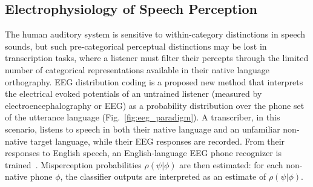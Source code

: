 \subsection{Electrophysiology of Speech Perception}

The human auditory system is sensitive to within-category distinctions
in speech sounds, but such pre-categorical perceptual distinctions may
be lost in transcription tasks, where a listener must filter their
percepts through the limited number of categorical representations
available in their native language orthography.  EEG distribution
coding is a proposed new method that interprets the electrical evoked
potentials of an untrained listener (measured by
electroencephalography or EEG) as a probability distribution
over the phone set of the utterance language
(Fig.~\ref{fig:eeg_paradigm}).  A transcriber, in this scenario, listens
to speech in both their native language and an unfamiliar non-native
target language, while their EEG responses are recorded.  From their
responses to English speech, an English-language EEG phone recognizer
is trained~\cite{Liberto15}.  Misperception probabilities
$\rho(\psi|\phi)$ are then estimated: for each non-native phone
$\phi$, the classifier outputs are interpreted as an estimate of
$\rho(\psi|\phi)$.

